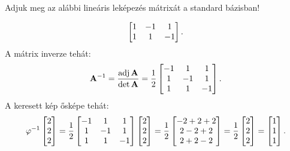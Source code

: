 \documentclass[exercise]{math-standalone}
\begin{document}
\begin{exercise}{%
    Adjuk meg az alábbi lineáris leképezés mátrixát a standard bázisban!
  }
{\begin{enumerate}
\[\begin{bmatrix}
                1  & -1 & 1  \\
                1  & 1  & -1 \\
              \end{bmatrix}
              \text.
            \]
            A mátrix inverze tehát:
            \[
              \mathbf{A}^{-1}
              = \frac{\operatorname{adj} \mathbf{A}}{\det \mathbf{A}}
              = \frac{1}{2} \begin{bmatrix}
                -1 & 1  & 1  \\
                1  & -1 & 1  \\
                1  & 1  & -1 \\
              \end{bmatrix}
              \text.
            \]
            A keresett kép ősképe tehát:
            \[
              \varphi^{-1} \begin{bmatrix}
                2 \\ 2 \\ 2
              \end{bmatrix} = \frac{1}{2} \begin{bmatrix}
                -1 & 1  & 1  \\
                1  & -1 & 1  \\
                1  & 1  & -1 \\
              \end{bmatrix} \begin{bmatrix}
                2 \\ 2 \\ 2
              \end{bmatrix} = \frac{1}{2} \begin{bmatrix}
                -2 + 2 + 2 \\ 2 - 2 + 2 \\ 2 + 2 - 2
              \end{bmatrix} = \frac{1}{2} \begin{bmatrix}
                2 \\ 2 \\ 2
              \end{bmatrix} = \begin{bmatrix}
                1 \\ 1 \\ 1
              \end{bmatrix}
              \text.
            \]


\end{enumerate}}
\end{exercise}
\end{document}
